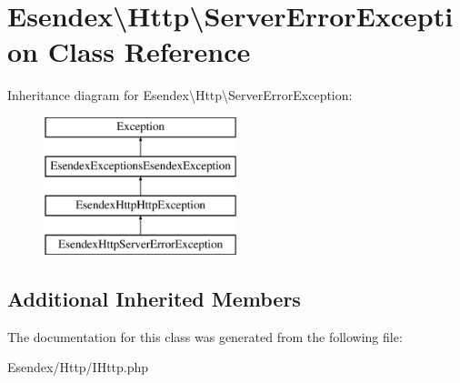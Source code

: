 \section{Esendex\textbackslash{}Http\textbackslash{}Server\-Error\-Exception Class Reference}
\label{class_esendex_1_1_http_1_1_server_error_exception}
Inheritance diagram for Esendex\textbackslash{}Http\textbackslash{}Server\-Error\-Exception\-:\begin{figure}[H]
\begin{center}
\leavevmode
\includegraphics[height=4.000000cm]{class_esendex_1_1_http_1_1_server_error_exception}
\end{center}
\end{figure}
\subsection*{Additional Inherited Members}


The documentation for this class was generated from the following file\-:\begin{DoxyCompactItemize}
\item 
Esendex/\-Http/I\-Http.\-php\end{DoxyCompactItemize}
